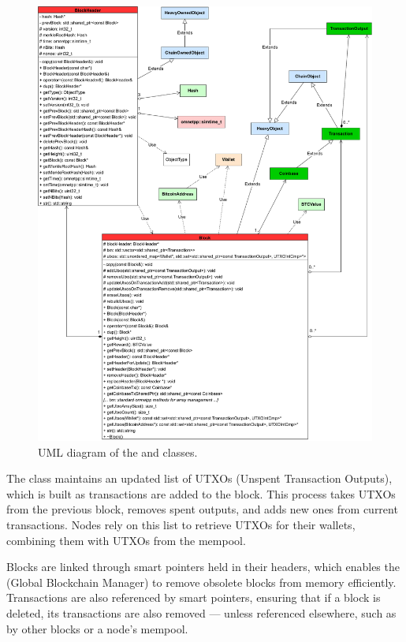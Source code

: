 \begin{figure}[tbhp]
	\centering
	\includegraphics[width=\textwidth]{img/block-uml}
	\caption{UML diagram of the  and 
	classes.}\label{fig:block-uml}
\end{figure}

The  class maintains an updated list of UTXOs (Unspent Transaction
Outputs), which is built as transactions are added to the block. This process
takes UTXOs from the previous block, removes spent outputs, and adds new ones
from current transactions. Nodes rely on this list to retrieve UTXOs for their
wallets, combining them with UTXOs from the mempool.

Blocks are linked through smart pointers held in their headers, which enables
the  (Global Blockchain Manager) to remove obsolete blocks from
memory efficiently. Transactions are also referenced by smart pointers,
ensuring that if a block is deleted, its transactions are also removed ---
unless referenced elsewhere, such as by other blocks or a node's mempool.
